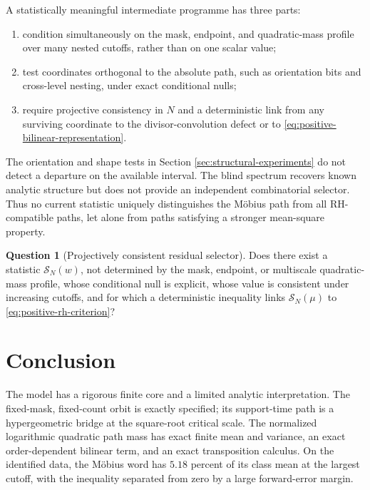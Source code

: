 \documentclass[11pt,reqno]{amsart}
\numberwithin{equation}{section}
\theoremstyle{plain}
\theoremstyle{definition}
\newtheorem{question}[theorem]{Question}
\theoremstyle{remark}
\begin{document}
A statistically meaningful intermediate programme has three parts:
\begin{enumerate}[label=(\roman*)]
\item condition simultaneously on the mask, endpoint, and quadratic-mass
profile over many nested cutoffs, rather than on one scalar value;
\item test coordinates orthogonal to the absolute path, such as orientation
bits and cross-level nesting, under exact conditional nulls;
\item require projective consistency in \(N\) and a deterministic link from
any surviving coordinate to the divisor-convolution defect or to
\eqref{eq:positive-bilinear-representation}.
\end{enumerate}
The orientation and shape tests in Section \ref{sec:structural-experiments}
do not detect a departure on the available interval.  The blind spectrum recovers known
analytic structure but does not provide an independent combinatorial
selector.  Thus no current statistic uniquely distinguishes the M\"obius
path from all RH-compatible paths, let alone from paths satisfying a stronger
mean-square property.

\begin{question}[Projectively consistent residual selector]
\label{ques:projective-selector}
Does there exist a statistic \(\mathcal S_N(w)\), not determined by the mask,
endpoint, or multiscale quadratic-mass profile, whose conditional null is
explicit, whose value is consistent under increasing cutoffs, and for which a
deterministic inequality links \(\mathcal S_N(\mu)\) to
\eqref{eq:positive-rh-criterion}?
\end{question}

\section{Conclusion}
\label{sec:conclusion}

The model has a rigorous finite core and a limited analytic interpretation.
The fixed-mask, fixed-count orbit is exactly specified; its support-time path
is a hypergeometric bridge at the square-root critical scale.  The normalized
logarithmic quadratic path mass has exact finite mean and variance, an exact
order-dependent bilinear term, and an exact transposition calculus.  On the
identified data, the M\"obius word has \(5.18\) percent of its class mean at
the largest cutoff, with the inequality separated from zero by a large
forward-error margin.
\end{document}
